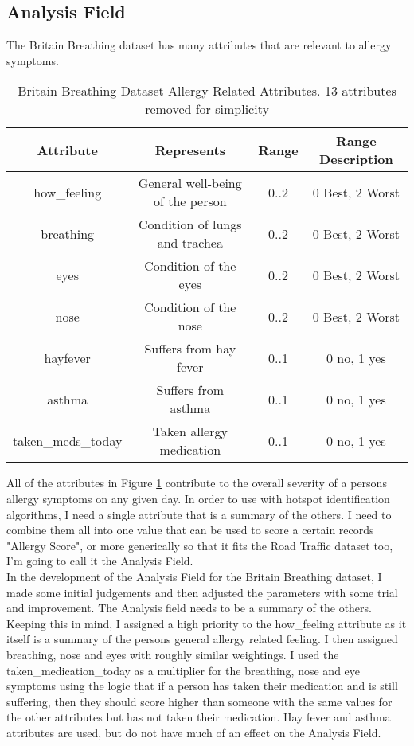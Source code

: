 \subsection{Analysis Field}
\label{sec:anal}

The Britain Breathing dataset has many attributes that are relevant to allergy symptoms.\\

\begin{table}[H]
\begin{tabular}{|c|c|c|c|}\hline\hline
Attribute&Represents&Range&Range Description\\\hline
how\_feeling&General well-being of the person&0..2&0 Best, 2 Worst\\
breathing&Condition of lungs and trachea&0..2&0 Best, 2 Worst\\
eyes&Condition of the eyes&0..2&0 Best, 2 Worst\\
nose&Condition of the nose&0..2&0 Best, 2 Worst\\
hayfever&Suffers from hay fever&0..1&0 no, 1 yes\\
asthma&Suffers from asthma&0..1&0 no, 1 yes\\
taken\_meds\_today&Taken allergy medication&0..1&0 no, 1 yes\\\hline\hline
\end{tabular}
\caption{Britain Breathing Dataset Allergy Related Attributes. 13 attributes removed for simplicity}
\label{bbdata}
\end{table}

All of the attributes in Figure \ref{bbdata} contribute to the overall severity of a persons allergy symptoms on any given day. In order to use with hotspot identification algorithms, I need a single attribute that is a summary of the others. I need to combine them all into one value that can be used to score a certain records "Allergy Score", or more generically so that it fits the Road Traffic dataset too, I'm going to call it the Analysis Field.\\

In the development of the Analysis Field for the Britain Breathing dataset, I made some initial judgements and then adjusted the parameters with some trial and improvement. The Analysis field needs to be a summary of the others. Keeping this in mind, I assigned a high priority to the how\_feeling attribute as it itself is a summary of the persons general allergy related feeling. I then assigned breathing, nose and eyes with roughly similar weightings. I used the taken\_medication\_today as a multiplier for the breathing, nose and eye symptoms using the logic that if a person has taken their medication and is still suffering, then they should score higher than someone with the same values for the other attributes but has not taken their medication. Hay fever and asthma attributes are used, but do not have much of an effect on the Analysis Field.\\

